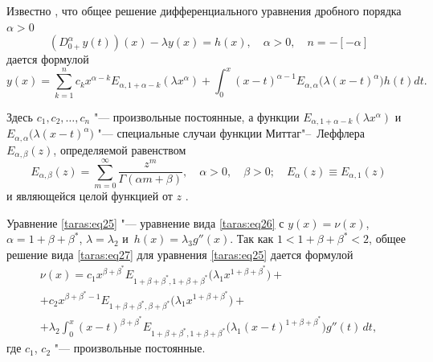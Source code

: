 Известно \cite{taras:1}, что общее решение дифференциального
уравнения дробного порядка $\alpha >0$
\begin{equation}
      \label{taras:eq26}
\left( D_{0+}^{ \alpha} y(t)\right)(x)- \lambda y(x)= h(x), \quad \alpha>0, \quad n= - [- \alpha]
\end{equation}
дается формулой
\begin{equation}
      \label{taras:eq27}
y(x) = \sum_{k=1}^{n} c_{k} x^{ \alpha-k} E_{ \alpha, 1+\alpha-k} ( \lambda x^{ \alpha}) + 
\int _{0}^{x} (x-t)^{ \alpha-1} E_{ \alpha, \alpha} \bigl( \lambda (x-t)^{ \alpha} \bigr) h(t)  dt.
\end{equation}

\noindent Здесь $c_{1}, c_2, \dots, c_{n}$ "--- произвольные постоянные, а функции $ E_{ \alpha, 1+\alpha-k} ( \lambda x^{ \alpha})$ и \linebreak ${E_{ \alpha, \alpha} \bigl( \lambda (x-t)^{ \alpha}\bigr)}$ "--- специальные случаи функции Миттаг"--~Леффлера $ E_{ \alpha, \beta}(z)$, определяемой равенством
\begin{equation}
       \label{taras:eq28}
E_{ \alpha, \beta}(z)= \sum_{m=0}^{ \infty} \frac{z^{m}}{ \Gamma( \alpha m + \beta)}, \quad  \alpha>0, \quad \beta >0; \quad E_{ \alpha}(z) \equiv E_{ \alpha, 1}(z)
\end{equation}
и являющейся целой функцией от $z$ \cite{taras:1}.

Уравнение \eqref{taras:eq25} "--- уравнение вида \eqref{taras:eq26} с 
$y(x)= \nu(x)$, $ \alpha = 1+\beta+\beta^{*}$, $\lambda = \lambda_{2}$ и~$h(x) = \lambda_{3} g''(x)$. 
Так как $1< 1+\beta+\beta^{*} < 2$, общее решение вида \eqref{taras:eq27} для уравнения \eqref{taras:eq25} дается формулой
\begin{multline}
\label{taras:eq29}
\nu(x) = c_{1} x^{\beta+\beta^{*}} E_{  1+\beta+\beta^{*}, 1+\beta+\beta^{*}} 
\bigl( \lambda_{1} x^{ 1+\beta+\beta^{*}} \bigr) + 
\\
+ c_{2} x^{ \beta+\beta^{*}-1} E_{ 1+\beta+\beta^{*}, \beta+\beta^{*}} 
\bigl( \lambda_{1} x^{ 1+\beta+\beta^{*}} \bigr) + 
\\
+ \lambda_{2} \int _{0}^{x} (x-t)^{ \beta+\beta^{*} } E_{ 1+\beta+\beta^{*}, 1+\beta+\beta^{*}} 
\bigl( \lambda_{1} (x-t)^{ 1+\beta+\beta^{*}} \bigr) g''(t) \, dt,
\end{multline}
где $c_{1}$, $c_{2}$ "--- произвольные постоянные.

